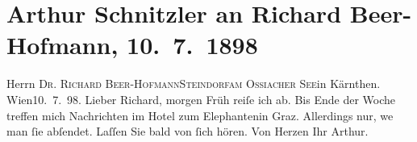 

         
         \renewcommand{\erwaehntePersonen}{Personen: Richard Beer-Hofmann}
         \renewcommand{\erwaehnteOrte}{Orte: Graz, Hotel Elefant, IX., Alsergrund, Kärnten, Ossiacher See, Steindorf am Ossiacher See, Wien}
         \renewcommand{\erwaehnteWerke}{}
               \section[Arthur Schnitzler an Richard Beer-Hofmann, 10. 7. 1898]{ Arthur Schnitzler an Richard Beer-Hofmann, 10. 7. 1898}\nopagebreak{}\rehead{ }\begin{ledgroupsized}[t]{13cm}\normalsize\beginnumbering \toendnotes[C]{\smallbreak\pagebreak[2]} 
\pstart{}{\pb}Herrn \textsc{Dr. Richard
                     Beer-Hofmann}\pend{}\pstart{}\textsc{Steindorf}\pend{}\pstart{}\textsc{am Ossiacher
                     See}\pend{}\pstart{}in Kärnthen.\pend{}{\bigskip}\pstart
           \raggedleft{}{\pb}Wien10. 7. 98.
               \pend
           \pstart{}Lieber Richard, \pend\pstart
           morgen Früh reiſe ich ab. Bis Ende der Woche treffen mich Nachrichten im Hotel zum
               Elephantenin Graz. Allerdings nur, we{\geminationn} man ſie {\pb}abſendet.\pend
           \pstart
           Laſſen Sie bald von ſich hören.\pend
           \pstart Von Herzen Ihr \spacefill\mbox{Arthur.}\pend{}
         
         \endnumbering{}\end{ledgroupsized}  \newcommand{\dateiname}{L00815}\newcommand{\titel}{Arthur Schnitzler an Richard Beer-Hofmann, 10. 7. 1898}\newcommand{\editorInnen}{Martin Anton Müller und Gerd-Hermann Susen}
      